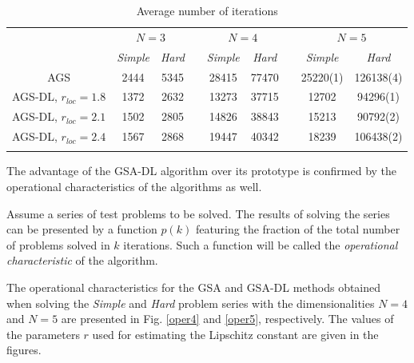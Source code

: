 \documentclass[runningheads]{llncs}
\begin{document}
\begin{table}
	\caption{Average number of iterations}
	\label{tab:1}
	\center
	\begin{tabular}{ccccccccc}
		\hline\noalign{\smallskip}
		 & \multicolumn{2}{c}{$N=3$} & & \multicolumn{2}{c}{$N=4$} & & \multicolumn{2}{c}{$N=5$}  \\
		\noalign{\smallskip} \cline{2-3} \cline{5-6} \cline{8-9} \noalign{\smallskip}
		 & \textit{Simple} & \textit{Hard} & & \textit{Simple} & \textit{Hard} & & \textit{Simple} & \textit{Hard}  \\
		\noalign{\smallskip} \hline \noalign{\smallskip}
									AGS	&	2444	&	5345	& &	28415	&	77470	& & 25220(1) & 126138(4)		\\
AGS-DL, $r_{loc}=1.8$	&	1372	&	2632	& &	13273	&	37715	& &	12702    & 94296(1)			\\
AGS-DL, $r_{loc}=2.1$	&	1502	&	2805	& &	14826	&	38843	& &	15213    & 90792(2)			\\
AGS-DL, $r_{loc}=2.4$	&	1567	&	2868	& &	19447	&	40342	& &	18239    & 106438(2)		\\
		\noalign{\smallskip}\hline
	\end{tabular}
\end{table}


The advantage of the GSA-DL algorithm over its prototype is confirmed by the operational characteristics of the algorithms as well. 

Assume a series of test problems to be solved. The results of solving the series can be presented by a function $p(k)$ featuring the fraction of the total number of problems solved in $k$ iterations. Such a function will be called the \textit{operational characteristic} of the algorithm. 


The operational characteristics for the GSA and GSA-DL methods obtained when solving the \textit{Simple} and \textit{Hard} problem series with the dimensionalities $N=4$ and $N=5$ are presented in Fig. \ref{oper4} and \ref{oper5}, respectively. The values of the parameters $r$ used for estimating the Lipschitz constant are given in the figures.
\end{document}

